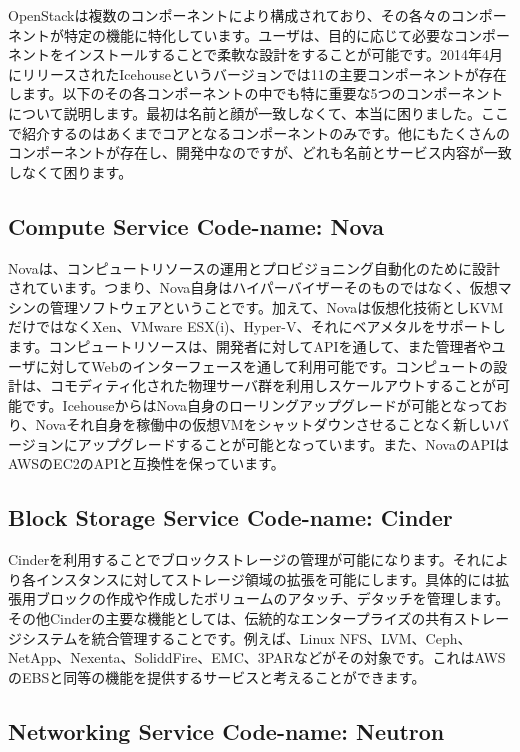 \documentclass[9pt,b5paper,tombo,openany]{jsbook}
\begin{document}
OpenStackは複数のコンポーネントにより構成されており、その各々のコンポーネントが特定の機能に特化しています。ユーザは、目的に応じて必要なコンポーネントをインストールすることで柔軟な設計をすることが可能です。2014年4月にリリースされたIcehouseというバージョンでは11の主要コンポーネントが存在します。以下のその各コンポーネントの中でも特に重要な5つのコンポーネントについて説明します。最初は名前と顔が一致しなくて、本当に困りました。ここで紹介するのはあくまでコアとなるコンポーネントのみです。他にもたくさんのコンポーネントが存在し、開発中なのですが、どれも名前とサービス内容が一致しなくて困ります。

\subsection{Compute Service Code-name: Nova}

Novaは、コンピュートリソースの運用とプロビジョニング自動化のために設計されています。つまり、Nova自身はハイパーバイザーそのものではなく、仮想マシンの管理ソフトウェアということです。加えて、Novaは仮想化技術としKVMだけではなくXen、VMware ESX(i)、Hyper-V、それにベアメタルをサポートします。コンピュートリソースは、開発者に対してAPIを通して、また管理者やユーザに対してWebのインターフェースを通して利用可能です。コンピュートの設計は、コモディティ化された物理サーバ群を利用しスケールアウトすることが可能です。IcehouseからはNova自身のローリングアップグレードが可能となっており、Novaそれ自身を稼働中の仮想VMをシャットダウンさせることなく新しいバージョンにアップグレードすることが可能となっています。また、NovaのAPIはAWSのEC2のAPIと互換性を保っています。

\subsection{Block Storage Service Code-name: Cinder}

Cinderを利用することでブロックストレージの管理が可能になります。それにより各インスタンスに対してストレージ領域の拡張を可能にします。具体的には拡張用ブロックの作成や作成したボリュームのアタッチ、デタッチを管理します。その他Cinderの主要な機能としては、伝統的なエンタープライズの共有ストレージシステムを統合管理することです。例えば、Linux NFS、LVM、Ceph、NetApp、Nexenta、SoliddFire、EMC、3PARなどがその対象です。これはAWSのEBSと同等の機能を提供するサービスと考えることができます。

\subsection{Networking Service Code-name: Neutron}
\end{document}
